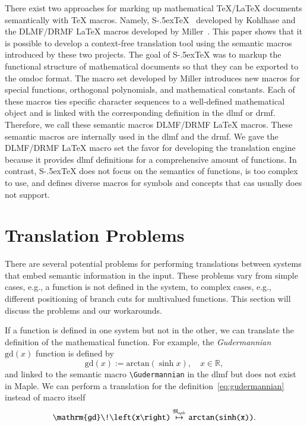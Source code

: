 \documentclass[a4paper,11pt]{article}
\newcommand{\DLMF}{DLMF}
\newcommand{\DRMF}{DRMF}
\newcommand{\Maple}{Maple}
\newcommand{\Macro}{\DLMF/\DRMF{} \LaTeX{} macro}
\newcommand{\langMaple}{\mathfrak{M}_{aple}}
\newcommand{\sTeX}{{\raisebox{-.5ex}S\kern-.5ex\TeX}}
\theoremstyle{defTheoStyle}
\theoremstyle{defExampStyle}
\DeclareRobustCommand{\Real}{\mathbb{R}}
\newcommand{\Gudermannian}[1]{\mathrm{gd}\!\left(#1\right)}
\newcommand{\atan}[1]{\mathrm{arctan}\!\left(#1\right)}
\begin{document}
There exist two approaches for marking up mathematical \TeX/\LaTeX{} documents semantically with \TeX{} macros. Namely, \sTeX{}~\parencite{sTeX} developed by Kohlhase and the \Macro s developed by Miller~\parencite{DLMF:Macros}. This paper shows that it is possible to develop a context-free translation tool using the semantic macros introduced by these two projects. The goal of \sTeX{} was to markup the functional structure of mathematical documents so that they can be exported to the \gls*{omdoc} format. The macro set developed by Miller introduces new macros for special functions, orthogonal polynomials, and mathematical constants. Each of these macros ties specific character sequences to a well-defined mathematical object and is linked with the corresponding definition in the \gls*{dlmf} or \gls*{drmf}. Therefore, we call these semantic macros \Macro s. These semantic macros are internally used in the \gls*{dlmf} and the \gls*{drmf}. We gave the \Macro{} set the favor for developing the translation engine because it provides \gls*{dlmf} definitions for a comprehensive amount of functions. In contrast, \sTeX{} does not focus on the semantics of functions, is too complex to use, and defines diverse macros for symbols and concepts that \gls*{cas} usually does not support.

 



\section{Translation Problems}\label{sec:problems}
There are several potential problems for performing translations between systems that embed semantic information in the input. These problems vary from simple cases, e.g., a function is not defined in the system, to complex cases, e.g., different positioning of branch cuts for multivalued functions. This section will discuss the problems and our workarounds.

If a function is defined in one system but not in the other, we can translate the definition of the mathematical function. For example, the \textit{Gudermannian}~\parencite[(4.23.10)]{NIST:DLMF} $\Gudermannian{x}$ function is defined by
\begin{equation}\label{eq:gudermannian}
\Gudermannian{x} := \atan{\sinh{x}}, \quad x \in \Real,
\end{equation}
and linked to the semantic macro \verb|\Gudermannian| in the \gls*{dlmf} but does not exist in \Maple. We can perform a translation for the definition~\eqref{eq:gudermannian} instead of macro itself
\begin{equation}\label{eq:guder-trans}
\verb|\Gudermannian{x}| \overset{\langMaple}{\mapsto} \texttt{arctan(sinh(x))}.
\end{equation}
\end{document}
